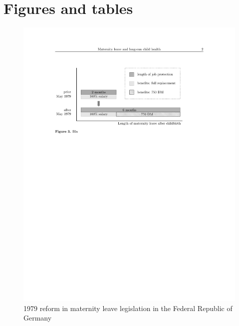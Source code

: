 \documentclass[11pt, a4paper,draft]{article} %
\begin{document}
\newpage






\newpage
\section{Figures and tables}

\begin{figure}[H]\centering
	\caption{1979 reform in maternity leave legislation in the Federal Republic of Germany}\label{fig: MLreform}
	\includegraphics[width=0.9\linewidth]{SOEP/Reform_shortened}

\end{figure}
\end{document}
